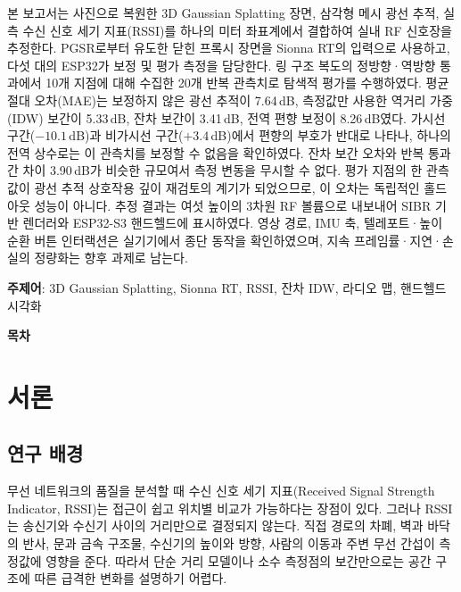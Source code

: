 \documentclass[11pt,a4paper]{article}
\makeatletter
\renewcommand{\tableofcontents}{%
  \begin{center}\bfseries\fontsize{16}{20}\selectfont 목\hspace{1.5em}차\end{center}
  \vspace{6pt}
  \begingroup\small\setlength{\parskip}{0pt}%
  \renewcommand{\numberline}[1]{\hb@xt@\@tempdima{##1.\hfil}}%
  \@starttoc{toc}\endgroup}
\makeatother
\begin{document}
본 보고서는 사진으로 복원한 3D Gaussian Splatting 장면, 삼각형 메시 광선 추적, 실측 수신 신호 세기
지표(RSSI)를 하나의 미터 좌표계에서 결합하여 실내 RF 신호장을 추정한다. PGSR로부터 유도한 닫힌 프록시
장면을 Sionna RT의 입력으로 사용하고, 다섯 대의 ESP32가 보정 및 평가 측정을 담당한다. 링 구조 복도의
정방향·역방향 통과에서 10개 지점에 대해 수집한 20개 반복 관측치로 탐색적 평가를 수행하였다. 평균 절대
오차(MAE)는 보정하지 않은 광선 추적이 7.64\,dB, 측정값만 사용한 역거리 가중(IDW) 보간이 5.33\,dB,
잔차 보간이 3.41\,dB, 전역 편향 보정이 8.26\,dB였다. 가시선 구간($-10.1$\,dB)과 비가시선
구간($+3.4$\,dB)에서 편향의 부호가 반대로 나타나, 하나의 전역 상수로는 이 관측치를 보정할 수 없음을
확인하였다. 잔차 보간 오차와 반복 통과 간 차이 3.90\,dB가 비슷한 규모여서 측정 변동을 무시할 수 없다.
평가 지점의 한 관측값이 광선 추적 상호작용 깊이 재검토의 계기가 되었으므로, 이 오차는 독립적인 홀드아웃
성능이 아니다. 추정 결과는 여섯 높이의 3차원 RF 볼륨으로 내보내어 SIBR 기반 렌더러와 ESP32-S3
핸드헬드에 표시하였다. 영상 경로, IMU 축, 텔레포트·높이 순환 버튼 인터랙션은 실기기에서 종단 동작을
확인하였으며, 지속 프레임률·지연·손실의 정량화는 향후 과제로 남는다.

\vspace{10pt}
\textbf{주제어}: 3D Gaussian Splatting, Sionna RT, RSSI, 잔차 IDW, 라디오 맵, 핸드헬드 시각화

\clearpage

\tableofcontents
\clearpage


\section{서론}

\subsection{연구 배경}

무선 네트워크의 품질을 분석할 때 수신 신호 세기 지표(Received Signal Strength Indicator, RSSI)는
접근이 쉽고 위치별 비교가 가능하다는 장점이 있다. 그러나 RSSI는 송신기와 수신기 사이의 거리만으로
결정되지 않는다. 직접 경로의 차폐, 벽과 바닥의 반사, 문과 금속 구조물, 수신기의 높이와 방향, 사람의
이동과 주변 무선 간섭이 측정값에 영향을 준다. 따라서 단순 거리 모델이나 소수 측정점의 보간만으로는 공간
구조에 따른 급격한 변화를 설명하기 어렵다.
\end{document}
